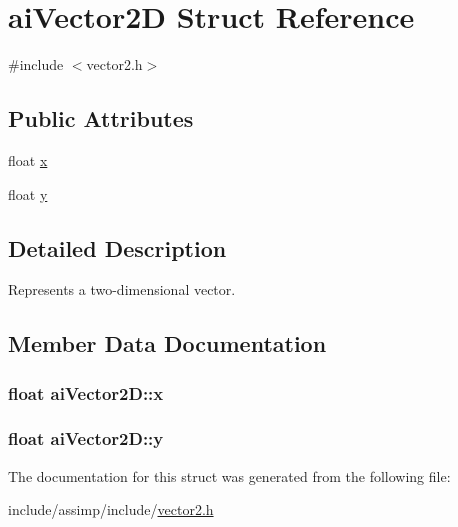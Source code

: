 \hypertarget{structai_vector2_d}{\section{ai\-Vector2\-D Struct Reference}
\label{structai_vector2_d}
}


{\ttfamily \#include $<$vector2.\-h$>$}

\subsection*{Public Attributes}
\begin{DoxyCompactItemize}
\item 
float \hyperlink{structai_vector2_d_a968e4db235e054f58b4c320576d82740}{x}
\item 
float \hyperlink{structai_vector2_d_a7bb1686f941459496627a3b8ce68e73f}{y}
\end{DoxyCompactItemize}


\subsection{Detailed Description}
Represents a two-\/dimensional vector. 

\subsection{Member Data Documentation}
\hypertarget{structai_vector2_d_a968e4db235e054f58b4c320576d82740}{
\subsubsection[{x}]{\setlength{\rightskip}{0pt plus 5cm}float ai\-Vector2\-D\-::x}}\label{structai_vector2_d_a968e4db235e054f58b4c320576d82740}
\hypertarget{structai_vector2_d_a7bb1686f941459496627a3b8ce68e73f}{
\subsubsection[{y}]{\setlength{\rightskip}{0pt plus 5cm}float ai\-Vector2\-D\-::y}}\label{structai_vector2_d_a7bb1686f941459496627a3b8ce68e73f}


The documentation for this struct was generated from the following file\-:\begin{DoxyCompactItemize}
\item 
include/assimp/include/\hyperlink{vector2_8h}{vector2.\-h}\end{DoxyCompactItemize}
